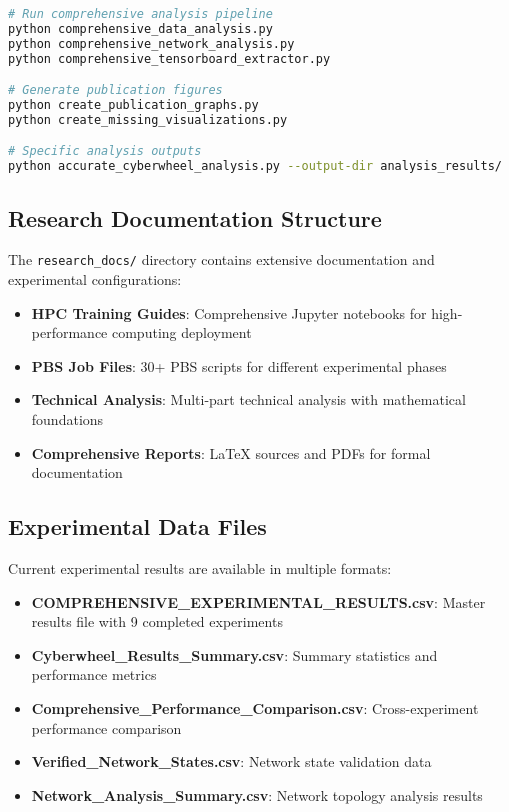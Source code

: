 \documentclass[12pt,a4paper]{article}
\begin{document}
\begin{lstlisting}[language=bash, caption=Analysis Pipeline Execution]
# Run comprehensive analysis pipeline
python comprehensive_data_analysis.py
python comprehensive_network_analysis.py  
python comprehensive_tensorboard_extractor.py

# Generate publication figures
python create_publication_graphs.py
python create_missing_visualizations.py

# Specific analysis outputs
python accurate_cyberwheel_analysis.py --output-dir analysis_results/
\end{lstlisting}

\subsection{Research Documentation Structure}

The \texttt{research\_docs/} directory contains extensive documentation and experimental configurations:

\begin{itemize}
    \item \textbf{HPC Training Guides}: Comprehensive Jupyter notebooks for high-performance computing deployment
    \item \textbf{PBS Job Files}: 30+ PBS scripts for different experimental phases
    \item \textbf{Technical Analysis}: Multi-part technical analysis with mathematical foundations
    \item \textbf{Comprehensive Reports}: LaTeX sources and PDFs for formal documentation
\end{itemize}

\subsection{Experimental Data Files}

Current experimental results are available in multiple formats:

\begin{itemize}
    \item \textbf{COMPREHENSIVE\_EXPERIMENTAL\_RESULTS.csv}: Master results file with 9 completed experiments
    \item \textbf{Cyberwheel\_Results\_Summary.csv}: Summary statistics and performance metrics
    \item \textbf{Comprehensive\_Performance\_Comparison.csv}: Cross-experiment performance comparison
    \item \textbf{Verified\_Network\_States.csv}: Network state validation data
    \item \textbf{Network\_Analysis\_Summary.csv}: Network topology analysis results
\end{itemize}
\end{document}
